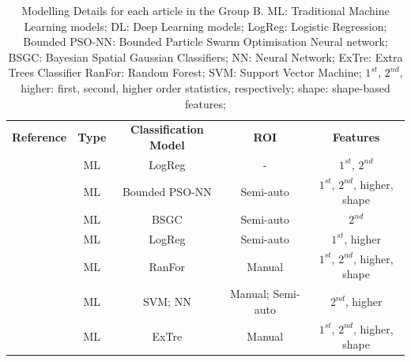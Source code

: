 \documentclass{article}
\begin{document}
\begin{table}[]
    \centering
    \begin{tabular}{ccccc}\toprule
        \multirow{2}{*}{\textbf{Reference}} & \multirow{2}{*}{\textbf{Type}} & \multirow{2}{*}{\textbf{Classification Model}} & \multirow{2}{*}{\textbf{ROI}} & \multirow{2}{*}{\textbf{Features}} \\
        \\ \midrule
        \cite{Shoemaker2018}                & ML                             & LogReg                                         & -                             & $1^{st}$, $2^{nd}$                 \\
        \cite{Koyuncu2019}                  & ML                             & Bounded PSO-NN                                 & Semi-auto                     & $1^{st}$, $2^{nd}$, higher, shape  \\
        \cite{Li2019}                       & ML                             & BSGC                                           & Semi-auto                     & $2^{nd}$                           \\
        \cite{Andersen2021}                 & ML                             & LogReg                                         & Semi-auto                     & $1^{st}$, higher                   \\
        \cite{Moawad2021}                   & ML                             & RanFor                                         & Manual                        & $1^{st}$, $2^{nd}$, higher, shape  \\
        \cite{Barstugan2020}                & ML                             & SVM; NN                                        & Manual; Semi-auto             & $2^{nd}$, higher                   \\
        \cite{Stanzione2021}                & ML                             & ExTre                                          & Manual                        & $1^{st}$, $2^{nd}$, higher, shape  \\
        \bottomrule
    \end{tabular}
    \caption{Modelling Details for each article in the Group B. ML: Traditional Machine Learning models; DL: Deep Learning models; LogReg: Logistic Regression;
        Bounded PSO-NN: Bounded Particle Swarm Optimisation Neural network; BSGC: Bayesian Spatial Gaussian Classifiers; NN: Neural Network; ExTre: Extra Trees Classifier
        RanFor: Random Forest; SVM: Support Vector Machine; $1^{st}$, $2^{nd}$, higher: first, second, higher order statistics, respectively; shape: shape-based features;}
    \label{tab:model_B}
\end{table}
\end{document}
